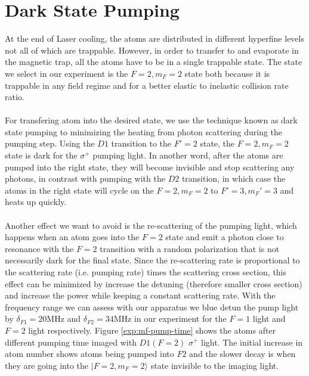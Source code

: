 \section{Dark State Pumping}\label{exp:pump}
At the end of Laser cooling, the atoms are distributed in different hyperfine levels not all of which are trappable. However, in order to transfer to and evaporate in the magnetic trap, all the atoms have to be in a single trappable state. The state we select in our experiment is the $F=2, m_F=2$ state both because it is trappable in any field regime and for a better elastic to inelastic collision rate ratio.\\
\\
For transfering atom into the desired state, we use the technique known as dark state pumping to minimizing the heating from photon scattering during the pumping step. Using the $D1$ transition to the $F'=2$ state, the $F=2, m_F=2$ state is dark for the $\sigma^+$ pumping light. In another word, after the atoms are pumped into the right state, they will become invisible and stop scattering any photons, in contrast with pumping with the $D2$ transition, in which case the atoms in the right state will cycle on the $F=2, m_F=2$ to $F'=3, m_F'=3$ and heats up quickly.\\
\\
Another effect we want to avoid is the re-scattering of the pumping light, which happens when an atom goes into the $F=2$ state and emit a photon close to resonance with the $F=2$ transition with a random polarization that is not necessarily dark for the final state. Since the re-scattering rate is proportional to the scattering rate (i.e. pumping rate) times the scattering cross section, this effect can be minimized by increase the detuning (therefore smaller cross section) and increase the power while keeping a constant scattering rate. With the frequency range we can assess with our apparatus we blue detun the pump light by $\delta_{F1}=20\text{MHz}$ and $\delta_{F2}=34\text{MHz}$ in our experiment for the $F=1$ light and $F=2$ light respectively. Figure \ref{exp:mf-pump-time} shows the atoms after different pumping time imaged with $D1 (F=2)$ $\sigma^+$ light. The initial increase in atom number shows atoms being pumped into $F2$ and the slower decay is when they are going into the $|F=2, m_F=2\rangle$ state invisible to the imaging light.
